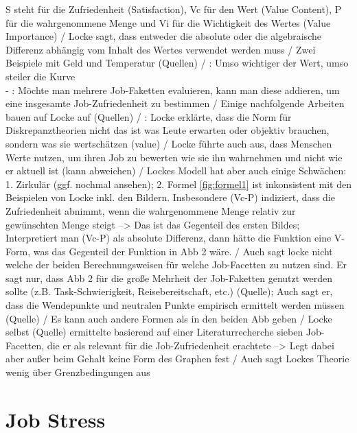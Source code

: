 S steht für die Zufriedenheit (Satisfaction),  Vc für den Wert (Value Content), P für die wahrgenommene Menge und Vi für die Wichtigkeit des Wertes (Value Importance) / Locke sagt, dass entweder die absolute oder die algebraische Differenz abhängig vom Inhalt des Wertes verwendet werden muss / Zwei Beispiele mit Geld und Temperatur (Quellen) / \cite[S. 14]{edwards:2008}: Umso wichtiger der Wert, umso steiler die Kurve \\
- \cite[S. 14]{edwards:2008}: Möchte man mehrere Job-Faketten evaluieren, kann man diese addieren, um eine insgesamte Job-Zufriedenheit zu bestimmen / Einige nachfolgende Arbeiten bauen auf Locke auf (Quellen) / \cite[S. 15]{edwards:2008}: Locke erklärte, dass die Norm für Diskrepanztheorien nicht das ist was Leute erwarten oder objektiv brauchen, sondern was sie wertschätzen (value) / Locke führte auch aus, dass Menschen Werte nutzen, um ihren Job zu bewerten wie sie ihn wahrnehmen und nicht wie er aktuell ist (kann abweichen) / Lockes Modell hat aber auch einige Schwächen: 1. Zirkulär (ggf. nochmal ansehen); 2. Formel \ref{fig:formel1} ist inkonsistent mit den Beispielen von Locke inkl. den Bildern. Insbesondere (Vc-P) indiziert, dass die Zufriedenheit abnimmt, wenn die wahrgenommene Menge relativ zur gewünschten Menge steigt --> Das ist das Gegenteil des ersten Bildes; Interpretiert man (Vc-P) als absolute Differenz, dann hätte die Funktion eine V-Form, was das Gegenteil der Funktion in Abb 2 wäre. / Auch sagt locke nicht welche der beiden Berechnungsweisen für welche Job-Facetten zu nutzen sind. Er sagt nur, dass Abb 2 für die große Mehrheit der Job-Faketten genutzt werden sollte (z.B. Task-Schwierigkeit, Reisebereitschaft, etc.) (Quelle); Auch sagt er, dass die Wendepunkte und neutralen Punkte empirisch ermittelt werden müssen (Quelle) / Es kann auch andere Formen als in den beiden Abb geben / Locke selbst (Quelle) ermittelte basierend auf einer Literaturrecherche sieben Job-Facetten, die er als relevant für die Job-Zufriedenheit erachtete --> Legt dabei aber außer beim Gehalt keine Form des Graphen fest / Auch sagt Lockes Theorie wenig über Grenzbedingungen aus

\section{Job Stress}
\label{ch:notizen:jobStress}
